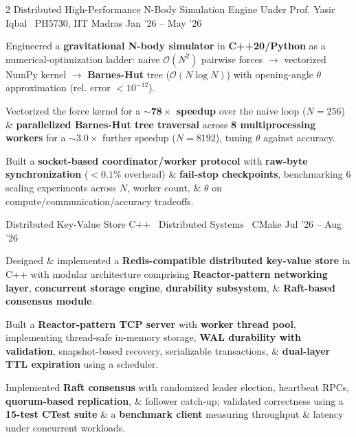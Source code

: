 \documentclass{resume}
\begin{document}
\begin{paracol}{2}
\resumeProject
{Distributed High-Performance N-Body Simulation Engine \href{https://hemanthdatta.github.io/comp-phy-proj/}{\small\faGlobe}}
{Under Prof. Yasir Iqbal \textbar\ PH5730, IIT Madras}
{Jan '26 -- May '26}
{
\begin{resumeItemize}
\item Engineered a \textbf{gravitational N-body simulator} in \textbf{C++20/Python} as a numerical-optimization ladder: naive $\mathcal{O}(N^2)$ pairwise forces $\rightarrow$ vectorized NumPy kernel $\rightarrow$ \textbf{Barnes-Hut} tree (\textbf{$\mathcal{O}(N \log N)$}) with opening-angle $\theta$ approximation (rel. error $< 10^{-12}$).
\item Vectorized the force kernel for a \textbf{$\mathbf{\sim 78\times}$ speedup} over the naive loop ($N=256$) \& \textbf{parallelized Barnes-Hut tree traversal} across \textbf{8 multiprocessing workers} for a \textbf{$\mathbf{\sim 3.0\times}$} further speedup ($N=8192$), tuning $\theta$ against accuracy.
\item Built a \textbf{socket-based coordinator/worker protocol} with \textbf{raw-byte synchronization} ($<0.1\%$ overhead) \& \textbf{fail-stop checkpoints}, benchmarking 6 scaling experiments across $N$, worker count, \& $\theta$ on compute/communication/accuracy tradeoffs.
\end{resumeItemize}
}
{\href{https://github.com/hemanthdatta/comp-phy-proj}{\faGithub}}
\resumeDivider

\resumeProject
{Distributed Key-Value Store}
{C++ \textbar\ Distributed Systems \textbar\ CMake}
{Jul '26 -- Aug '26}
{
\begin{resumeItemize}
\item Designed \& implemented a \textbf{Redis-compatible distributed key-value store} in C++ with modular architecture comprising \textbf{Reactor-pattern networking layer}, \textbf{concurrent storage engine}, \textbf{durability subsystem}, \& \textbf{Raft-based consensus module}.
\item Built a \textbf{Reactor-pattern TCP server} with \textbf{worker thread pool}, implementing thread-safe in-memory storage, \textbf{WAL durability with validation}, snapshot-based recovery, serializable transactions, \& \textbf{dual-layer TTL expiration} using a scheduler.
\item Implemented \textbf{Raft consensus} with randomized leader election, heartbeat RPCs, \textbf{quorum-based replication}, \& follower catch-up; validated correctness using a \textbf{15-test CTest suite} \& a \textbf{benchmark client} measuring throughput \& latency under concurrent workloads.
\end{resumeItemize}
}
{\href{https://github.com/hemanthdatta/distributed-kv-store}{\faGithub}}
\resumeDivider


\end{paracol}
\end{document}
